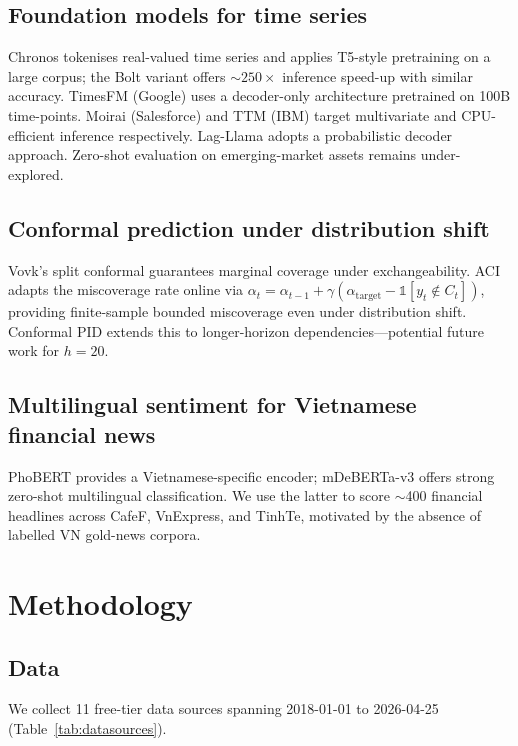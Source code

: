 \documentclass[conference]{IEEEtran}
\begin{document}
\subsection{Foundation models for time series}
Chronos \cite{ansari2024chronos} tokenises real-valued time series and applies T5-style pretraining on a large corpus; the Bolt variant offers $\sim$$250\times$ inference speed-up with similar accuracy. TimesFM \cite{das2024timesfm} (Google) uses a decoder-only architecture pretrained on 100B time-points. Moirai (Salesforce) and TTM \cite{ekambaram2024ttm} (IBM) target multivariate and CPU-efficient inference respectively. Lag-Llama \cite{rasul2024laglama} adopts a probabilistic decoder approach. Zero-shot evaluation on emerging-market assets remains under-explored.

\subsection{Conformal prediction under distribution shift}
Vovk's split conformal \cite{vovk2005} guarantees marginal coverage under exchangeability. ACI \cite{gibbs2021aci} adapts the miscoverage rate online via $\alpha_t = \alpha_{t-1} + \gamma(\alpha_{\text{target}} - \mathbb{1}[y_t \notin C_t])$, providing finite-sample bounded miscoverage even under distribution shift. Conformal PID \cite{angelopoulos2024conformalpid} extends this to longer-horizon dependencies---potential future work for $h=20$.

\subsection{Multilingual sentiment for Vietnamese financial news}
PhoBERT \cite{nguyen2020phobert} provides a Vietnamese-specific encoder; mDeBERTa-v3 \cite{he2023mdeberta} offers strong zero-shot multilingual classification. We use the latter to score $\sim$400 financial headlines across CafeF, VnExpress, and TinhTe, motivated by the absence of labelled VN gold-news corpora.

\section{Methodology}

\subsection{Data}
We collect 11 free-tier data sources spanning 2018-01-01 to 2026-04-25 (Table~\ref{tab:datasources}).
\end{document}
